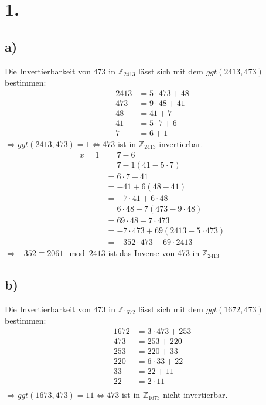 \documentclass[a4paper]{scrartcl}
\title{\titleinfo}
\author{Arne Struck 6326505}
\date{\today}
\begin{document}
\maketitle
\notag
\section{1.}
	\subsection{a)}		
		Die Invertierbarkeit von 473 in \(\mathbb{Z}_{2413}\) lässt sich mit dem \(ggt(2413,473)\) 
		bestimmen:
		\begin{align}
			2413&=5\cdot 473+48 \\
			473&=9\cdot 48 +41 \\
			48&=41+7 \\
			41&=5\cdot 7+6 \\
			7&= 6 +1
		\end{align}
		\(\Rightarrow ggt(2413,473)=1\Leftrightarrow 473\) ist in \(\mathbb{Z}_{2413}\) invertierbar.
		\begin{align}
			x=1&=7-6 \\
			&=7-1(41-5\cdot 7) \\
			&=6\cdot 7 -41 \\
			&=-41+6(48-41) \\
			&=-7\cdot 41+6\cdot 48 \\
			&=6\cdot 48 -7(473-9\cdot 48) \\
			&=69\cdot 48-7\cdot 473 \\
			&=-7\cdot 473+69(2413-5\cdot 473) \\
			&=-352\cdot 473+ 69\cdot 2413
		\end{align}
		\(\Rightarrow -352\equiv \underline{2061} \mod 2413\) ist das Inverse von 473 in 
		\(\mathbb{Z}_{2413}\)
	
	\subsection{b)}
		Die Invertierbarkeit von 473 in \(\mathbb{Z}_{1672}\) lässt sich mit dem \(ggt(1672,473)\) 
		bestimmen:
		\begin{align}
			1672&=3\cdot 473+253 \\
			473&=253+220 \\
			253&=220+33 \\
			220&=6\cdot 33+22 \\
			33&=22+11 \\
			22&=2\cdot 11 \\
		\end{align}
		\(\Rightarrow ggt(1673,473)=11\Leftrightarrow 473\) ist in \(\mathbb{Z}_{1673}\) nicht 
		invertierbar.
\end{document}
